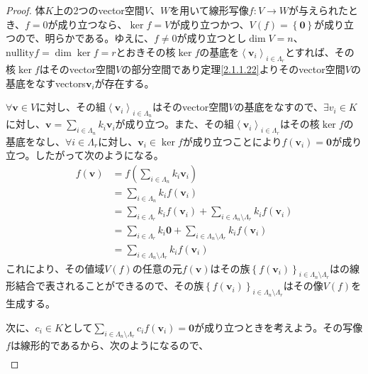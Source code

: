 \documentclass[dvipdfmx]{jsarticle}
\begin{document}
\begin{proof}
体$K$上の2つのvector空間$V$、$W$を用いて線形写像$f:V \rightarrow W$が与えられたとき、$f = 0$が成り立つなら、$\ker f = V$が成り立つかつ、$V(f) = \left\{ \mathbf{0} \right\}$が成り立つので、明らかである。ゆえに、$f \neq 0$が成り立つとし$\dim V = n$、${\mathrm{nullity}}f = \dim{\ker f} = r$とおきその核$\ker f$の基底を$\left\langle \mathbf{v}_{i} \right\rangle_{i \in \varLambda_{r}}$とすれば、その核$\ker f$はそのvector空間$V$の部分空間であり定理\ref{2.1.1.22}よりそのvector空間$V$の基底をなすvectors$\mathbf{v}_{i}$が存在する。\par
$\forall\mathbf{v} \in V$に対し、その組$\left\langle \mathbf{v}_{i} \right\rangle_{i \in \varLambda_{n}}$はそのvector空間$V$の基底をなすので、$\exists v_{i} \in K$に対し、$\mathbf{v} = \sum_{i \in \varLambda_{n}} {k_{i}\mathbf{v}_{i}}$が成り立つ。また、その組$\left\langle \mathbf{v}_{i} \right\rangle_{i \in \varLambda_{r}}$はその核$\ker f$の基底をなし、$\forall i \in \varLambda_{r}$に対し、$\mathbf{v}_{i} \in \ker f$が成り立つことにより$f\left( \mathbf{v}_{i} \right) = \mathbf{0}$が成り立つ。したがって次のようになる。
\begin{align*}
f\left( \mathbf{v} \right) &= f\left( \sum_{i \in \varLambda_{n}} {k_{i}\mathbf{v}_{i}} \right)\\
&= \sum_{i \in \varLambda_{n}} {k_{i}f\left( \mathbf{v}_{i} \right)}\\
&= \sum_{i \in \varLambda_{r}} {k_{i}f\left( \mathbf{v}_{i} \right)} + \sum_{i \in \varLambda_{n} \setminus \varLambda_{r}} {k_{i}f\left( \mathbf{v}_{i} \right)}\\
&= \sum_{i \in \varLambda_{r}} {k_{i}\mathbf{0}} + \sum_{i \in \varLambda_{n} \setminus \varLambda_{r}} {k_{i}f\left( \mathbf{v}_{i} \right)}\\
&= \sum_{i \in \varLambda_{n} \setminus \varLambda_{r}} {k_{i}f\left( \mathbf{v}_{i} \right)}
\end{align*}
これにより、その値域$V(f)$の任意の元$f\left( \mathbf{v} \right)$はその族$\left\{ f\left( \mathbf{v}_i \right) \right\}_{i \in \varLambda_{n} \setminus \varLambda_{r} } $はの線形結合で表されることができるので、その族$\left\{ f\left( \mathbf{v}_i \right) \right\}_{i \in \varLambda_{n} \setminus \varLambda_{r} } $はその像$V(f)$を生成する。\par
次に、$c_{i} \in K$として$\sum_{i \in \varLambda_{n} \setminus \varLambda_{r}} {c_{i}f\left( \mathbf{v}_{i} \right)} = \mathbf{0}$が成り立つときを考えよう。その写像$f$は線形的であるから、次のようになるので、
\begin{align*}

\end{align*}
\end{proof}
\end{document}
